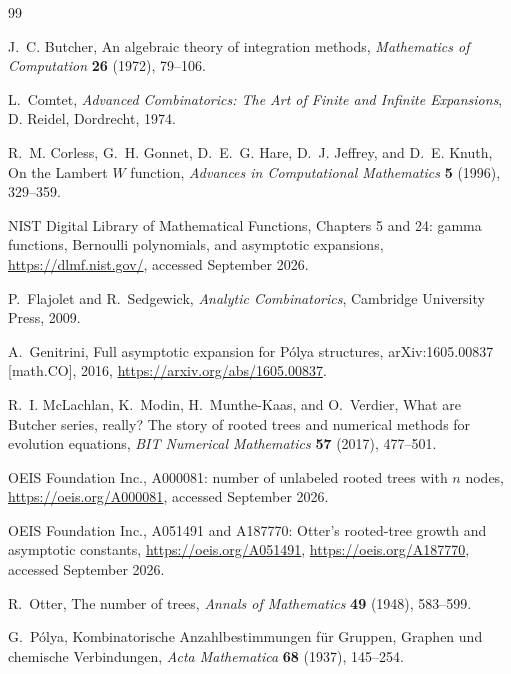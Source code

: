 \documentclass[11pt,oneside]{article}
\numberwithin{equation}{section}
\theoremstyle{plain}
\theoremstyle{definition}
\theoremstyle{remark}
\begin{document}
\begin{thebibliography}{99}

J.~C. Butcher,
\newblock An algebraic theory of integration methods,
\newblock \emph{Mathematics of Computation} \textbf{26} (1972), 79--106.

L.~Comtet,
\newblock \emph{Advanced Combinatorics: The Art of Finite and Infinite Expansions},
\newblock D. Reidel, Dordrecht, 1974.

R.~M. Corless, G.~H. Gonnet, D.~E.~G. Hare, D.~J. Jeffrey, and D.~E. Knuth,
\newblock On the Lambert $W$ function,
\newblock \emph{Advances in Computational Mathematics} \textbf{5} (1996),
329--359.

NIST Digital Library of Mathematical Functions,
\newblock Chapters 5 and 24: gamma functions, Bernoulli polynomials, and
asymptotic expansions,
\newblock \url{https://dlmf.nist.gov/}, accessed September 2026.

P.~Flajolet and R.~Sedgewick,
\newblock \emph{Analytic Combinatorics},
\newblock Cambridge University Press, 2009.

A.~Genitrini,
\newblock Full asymptotic expansion for P\'olya structures,
\newblock arXiv:1605.00837 [math.CO], 2016,
\newblock \url{https://arxiv.org/abs/1605.00837}.

R.~I. McLachlan, K.~Modin, H.~Munthe-Kaas, and O.~Verdier,
\newblock What are Butcher series, really? The story of rooted trees and
numerical methods for evolution equations,
\newblock \emph{BIT Numerical Mathematics} \textbf{57} (2017), 477--501.

OEIS Foundation Inc.,
\newblock A000081: number of unlabeled rooted trees with $n$ nodes,
\newblock \url{https://oeis.org/A000081}, accessed September 2026.

OEIS Foundation Inc.,
\newblock A051491 and A187770: Otter's rooted-tree growth and asymptotic
constants,
\newblock \url{https://oeis.org/A051491},
\url{https://oeis.org/A187770}, accessed September 2026.

R.~Otter,
\newblock The number of trees,
\newblock \emph{Annals of Mathematics} \textbf{49} (1948), 583--599.

G.~P\'olya,
\newblock Kombinatorische Anzahlbestimmungen f\"ur Gruppen, Graphen und
chemische Verbindungen,
\newblock \emph{Acta Mathematica} \textbf{68} (1937), 145--254.


\end{thebibliography}
\end{document}
